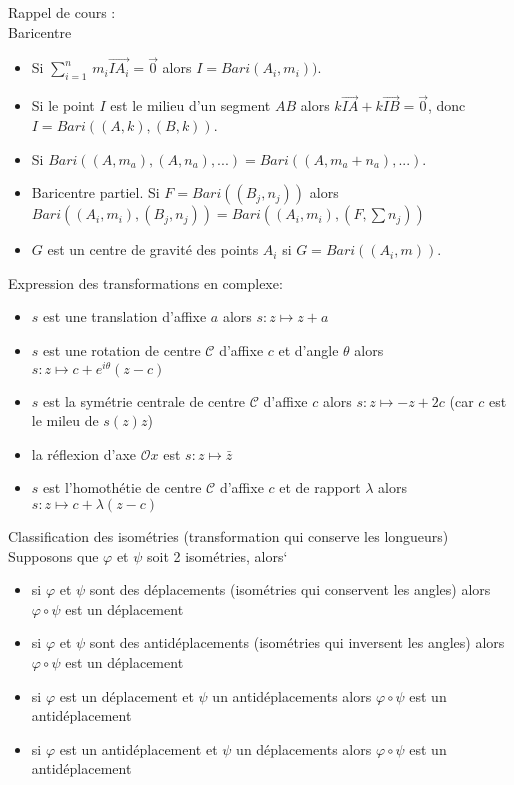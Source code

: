\documentclass[]{book}
\theoremstyle{definition}
\begin{document}
Rappel de cours :\\
Baricentre
\begin{itemize}
\item Si $\sum_{i=1}^{n}\, m_i\overrightarrow{IA_i} = \overrightarrow{0}$ alors $I = Bari(A_i, m_i))$.
\item Si le point $I$ est le milieu d'un segment $AB$ alors $k\overrightarrow{IA}+k\overrightarrow{IB} = \overrightarrow{0}$, donc $I=Bari((A,k),(B,k))$.
\item Si $Bari((A,m_a), (A,n_a), ...) = Bari((A,m_a+n_a), ...)$.
\item Baricentre partiel. Si $F = Bari((B_j, n_j))$ alors $Bari((A_i,m_i),(B_j, n_j)) = Bari((A_i,m_i),(F,\sum n_j))$
\item $G$ est un centre de gravit\'e des points $A_i$ si $G=Bari((A_i, m))$.
\end{itemize}


Expression des transformations en complexe:
\begin{itemize}
\item $s$ est une translation d'affixe $a$ alors $s: z \mapsto z + a$
\item $s$ est une rotation de centre $\mathcal{C}$ d'affixe $c$ et d'angle $\theta$ alors $s: z \mapsto c + e^{i\theta}(z -c)$
\item $s$ est la sym\'etrie centrale de centre $\mathcal{C}$ d'affixe $c$ alors $s: z \mapsto -z + 2c$ (car $c$ est le mileu de $s(z)z$)
\item la r\'eflexion d'axe $\mathcal{O}x$ est $s: z \mapsto \bar{z}$ 
\item $s$ est l'homoth\'etie de centre $\mathcal{C}$ d'affixe $c$ et de rapport $\lambda$ alors $s: z \mapsto c + \lambda(z-c)$
\end{itemize}

Classification des isom\'etries (transformation qui conserve les longueurs)\\
Supposons que $\varphi$ et $\psi$ soit 2 isom\'etries, alors`
\begin{itemize}
\item si $\varphi$ et $\psi$ sont des d\'eplacements (isom\'etries qui conservent les angles) alors $\varphi \circ \psi$ est un d\'eplacement
\item si $\varphi$ et $\psi$ sont des antid\'eplacements (isom\'etries qui inversent les angles) alors $\varphi \circ \psi$ est un d\'eplacement
\item si $\varphi$ est un d\'eplacement et $\psi$ un antid\'eplacements alors $\varphi \circ \psi$ est un antid\'eplacement
\item si $\varphi$ est un antid\'eplacement et $\psi$ un d\'eplacements alors $\varphi \circ \psi$ est un antid\'eplacement
\end{itemize}
\end{document}
